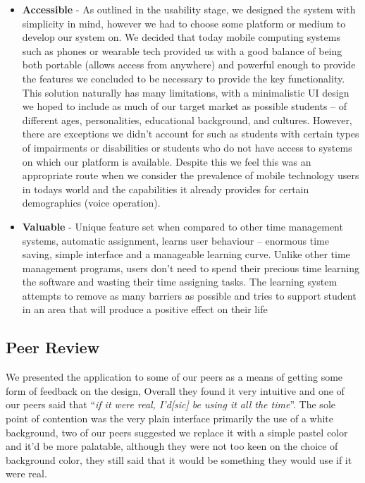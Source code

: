 \documentclass{article}
\begin{document}
\begin{itemize}
		\item \textbf{Accessible} - As outlined in the usability stage, we designed the system with simplicity in mind, however we had to choose some platform or medium to develop our system on. We decided that today mobile computing systems such as phones or wearable tech provided us with a good balance of being both portable (allows access from anywhere) and powerful enough to provide the features we concluded to be necessary to provide the key functionality. This solution naturally has many limitations, with a minimalistic UI design we hoped to include as much of our target market as possible students – of different ages, personalities, educational background, and cultures. However, there are exceptions we didn’t account for such as students with certain types of impairments or disabilities or students who do not have access to systems on which our platform is available. Despite this we feel this was an appropriate route when we consider the prevalence of mobile technology users in todays world and the capabilities it already provides for certain demographics (voice operation).
		\item \textbf{Valuable} - Unique feature set when compared to other time management systems, automatic assignment, learns user behaviour – enormous time saving, simple interface and a manageable learning curve. Unlike other time management programs, users don’t need to spend their precious time learning the software and wasting their time assigning tasks. The learning system attempts to remove as many barriers as possible and tries to support student in an area that will produce a positive effect on their life
	\end{itemize}
	\subsection{Peer Review}
	We presented the application to some of our peers as a means of getting some form of feedback on the design, Overall they found it very intuitive and one of our peers said that ``\textit{if it were real, I'd[sic] be using it all the time}''. The sole point of contention was the very plain interface primarily the use of a white background, two of our peers suggested we replace it with a simple pastel color and it'd be more palatable, although they were not too keen on the choice of background color, they still said that it would be something they would use if it were real.
	
	
\end{document}
